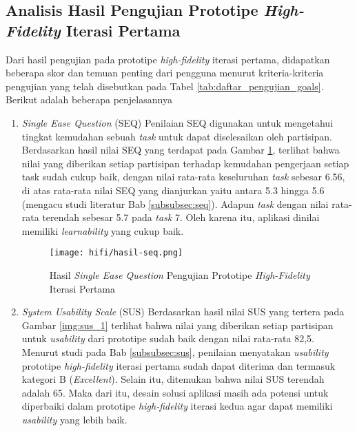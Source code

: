 \newpage

\subsection{Analisis Hasil Pengujian Prototipe \textit{High-Fidelity} Iterasi Pertama}
\label{subsec:test_1_analisis}

Dari hasil pengujian pada prototipe \textit{high-fidelity} iterasi pertama, didapatkan beberapa skor dan temuan penting dari pengguna menurut kriteria-kriteria pengujian yang telah disebutkan pada Tabel \ref{tab:daftar_pengujian_goals}. Berikut adalah beberapa penjelasannya

\begin{enumerate}
  \item \textit{Single Ease Question} (SEQ)
  \subitem  Penilaian SEQ digunakan untuk mengetahui tingkat kemudahan sebuah \textit{task} untuk dapat diselesaikan oleh partisipan. Berdasarkan hasil nilai SEQ yang terdapat pada Gambar \ref{img:seq_1}, terlihat bahwa nilai yang diberikan setiap partisipan terhadap kemudahan pengerjaan setiap task sudah cukup baik, dengan nilai rata-rata keseluruhan \textit{task} sebesar 6.56, di atas rata-rata nilai SEQ yang dianjurkan yaitu antara 5.3 hingga 5.6 (mengacu studi literatur Bab \ref{subsubsec:seq}). Adapun \textit{task} dengan nilai rata-rata terendah sebesar 5.7 pada \textit{task} 7. Oleh karena itu, aplikasi dinilai memiliki \textit{learnability} yang cukup baik. 

  \begin{figure}[h]
    \centering
    \texttt{[image: hifi/hasil-seq.png]}
    \caption{Hasil \textit{Single Ease Question} Pengujian Prototipe \textit{High-Fidelity} Iterasi Pertama}
    \label{img:seq_1}
  \end{figure}
  \FloatBarrier

  \item \textit{System Usability Scale} (SUS)
  \subitem  Berdasarkan hasil nilai SUS yang tertera pada Gambar \ref{img:sus_1} terlihat bahwa nilai yang diberikan setiap partisipan untuk \textit{usability} dari prototipe sudah baik dengan nilai rata-rata 82,5. Menurut studi pada Bab \ref{subsubsec:sus}, penilaian menyatakan \textit{usability} prototipe \textit{high-fidelity} iterasi pertama sudah dapat diterima dan termasuk kategori B (\textit{Excellent}). Selain itu, ditemukan bahwa nilai SUS terendah adalah 65. Maka dari itu, desain solusi aplikasi masih ada potensi untuk diperbaiki dalam prototipe \textit{high-fidelity} iterasi kedua agar dapat memiliki \textit{usability} yang lebih baik. 


\end{enumerate}
